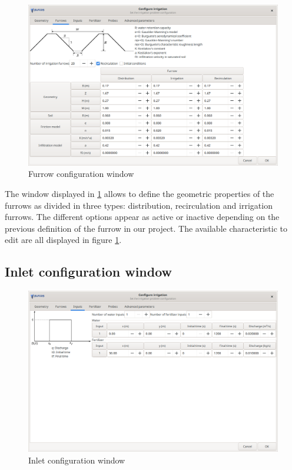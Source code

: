 \begin{figure}[!h]
\begin{center}
\includegraphics*[width=\textwidth]{images/confSurcoEN.png}
\qquad
\caption{Furrow configuration window}\label{confSurcos}
\end{center}
\end{figure}

The window displayed in \ref{confSurcos} allows to define the geometric properties of the furrows as divided in three types: distribution, recirculation and irrigation furrows. The different options appear as active or inactive depending on the previous definition of the furrow in our project. The available characteristic to edit are all displayed in figure \ref{confSurcos}.

\subsection{Inlet configuration window}

\begin{figure}[!h]
\begin{center}
\includegraphics*[width=\textwidth]{images/confInputEN.png}
\qquad
\caption{Inlet configuration window}\label{input}
\end{center}
\end{figure}

